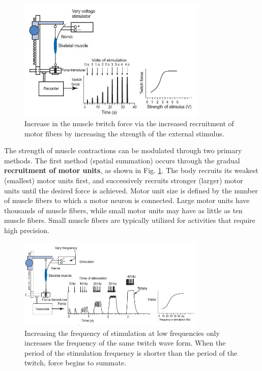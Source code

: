 \documentclass{article}
\begin{document}
\begin{figure}[h]
\includegraphics[width=0.8\textwidth]{../images/EMG_I_2.jpg}
\centering
\caption{Increase in the muscle twitch force via the increased recruitment of motor fibers by increasing the strength of the external stimulus.}
\label{force}
\end{figure}

The strength of muscle contractions can be modulated through two primary methods. The first method (spatial summation) occurs through the gradual \textbf{recruitment of motor units}, as shown in Fig. \ref{force}. The body recruits its weakest (smallest) motor units first, and successively recruits stronger (larger) motor units until the desired force is achieved. Motor unit size is defined by the number of muscle fibers to which a motor neuron is connected. Large motor units have thousands of muscle fibers, while small motor units may have as little as ten muscle fibers. Small muscle fibers are typically utilized for activities that require high precision.

\begin{figure}[h]
\includegraphics[width=0.8\textwidth]{../images/EMG_I_3.jpg}
\centering
\caption{Increasing the frequency of stimulation at low frequencies only increases the frequency of the same twitch wave form. When the period of the stimulation frequency is shorter than the period of the twitch, force begins to summate.}
\label{freq}
\end{figure}
\end{document}
